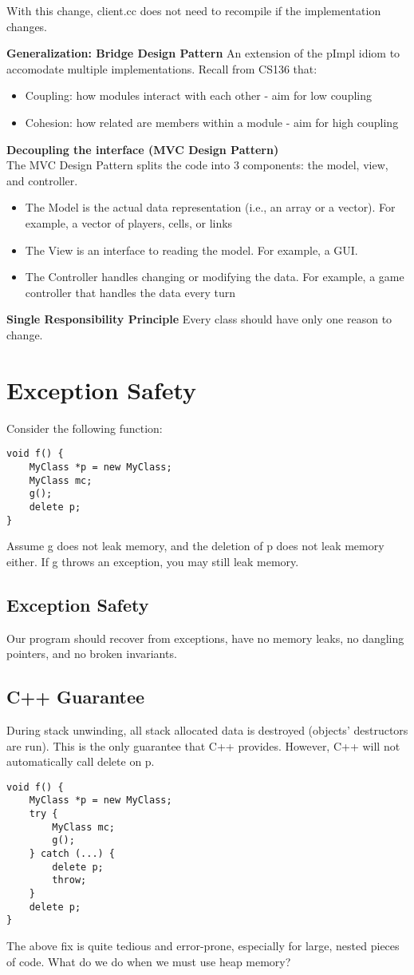 \documentclass[12pt]{article}
\begin{document}
With this change, client.cc does not need to recompile if the implementation changes.

\textbf{Generalization: Bridge Design Pattern}
An extension of the pImpl idiom to accomodate multiple implementations. Recall from CS136 that:
\begin{itemize}
    \item Coupling: how modules interact with each other - aim for low coupling
    \item Cohesion: how related are members within a module - aim for high coupling
\end{itemize}

\textbf{Decoupling the interface (MVC Design Pattern)}\\
The MVC Design Pattern splits the code into 3 components: the model, view, and controller.
\begin{itemize}
    \item The Model is the actual data representation (i.e., an array or a vector). For example, a vector of players, cells, or links
    \item The View is an interface to reading the model. For example, a GUI.
    \item The Controller handles changing or modifying the data. For example, a game controller that handles the data every turn
\end{itemize}

\textbf{Single Responsibility Principle}
Every class should have only one reason to change.

\section{Exception Safety}
Consider the following function:
\begin{lstlisting}
void f() {
    MyClass *p = new MyClass;
    MyClass mc;
    g();
    delete p;
}
\end{lstlisting}
Assume g does not leak memory, and the deletion of p does not leak memory either. If g throws an exception, you may still leak memory.
\subsection{Exception Safety}
Our program should recover from exceptions, have no memory leaks, no dangling pointers, and no broken invariants.
\subsection{C++ Guarantee}
During stack unwinding, all stack allocated data is destroyed (objects' destructors are run). This is the only guarantee that C++ provides. However, C++ will not automatically call delete on p.
\begin{lstlisting}
void f() {
    MyClass *p = new MyClass;
    try {
        MyClass mc;
        g();
    } catch (...) {
        delete p;
        throw;
    }
    delete p;
}
\end{lstlisting}
The above fix is quite tedious and error-prone, especially for large, nested pieces of code. What do we do when we must use heap memory?
\end{document}
